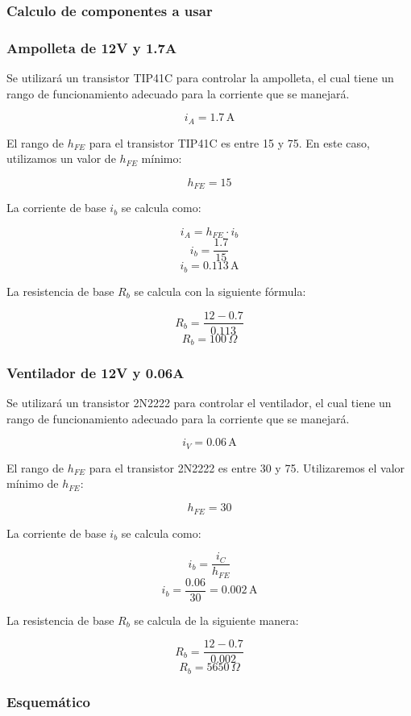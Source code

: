\documentclass[spanish, a4paper, 11pt]{article}
\begin{document}
\subsubsection{Calculo de componentes a usar}

\subsubsection*{Ampolleta de 12V y 1.7A}

Se utilizará un transistor TIP41C para controlar la ampolleta, el cual tiene un rango de funcionamiento adecuado para la corriente que se manejará.

\[
i_A = 1.7 \, \text{A}
\]

El rango de \( h_{FE} \) para el transistor TIP41C es entre 15 y 75. En este caso, utilizamos un valor de \( h_{FE} \) mínimo:

\[
h_{FE} = 15
\]

La corriente de base \( i_b \) se calcula como:

\[
i_A = h_{FE} \cdot i_b
\]
\[
i_b = \frac{1.7}{15}
\]
\[
i_b = 0.113 \, \text{A}
\]

La resistencia de base \( R_b \) se calcula con la siguiente fórmula:

\[
R_b = \frac{12 - 0.7}{0.113}
\]
\[
R_b = 100 \, \Omega
\]

\subsubsection*{Ventilador de 12V y 0.06A}

Se utilizará un transistor 2N2222 para controlar el ventilador, el cual tiene un rango de funcionamiento adecuado para la corriente que se manejará.

\[
i_V = 0.06 \, \text{A}
\]

El rango de \( h_{FE} \) para el transistor 2N2222 es entre 30 y 75. Utilizaremos el valor mínimo de \( h_{FE} \):

\[
h_{FE} = 30
\]

La corriente de base \( i_b \) se calcula como:

\[
i_b = \frac{i_C}{h_{FE}}
\]
\[
i_b = \frac{0.06}{30} = 0.002 \, \text{A}
\]

La resistencia de base \( R_b \) se calcula de la siguiente manera:

\[
R_b = \frac{12 - 0.7}{0.002}
\]
\[
R_b = 5650 \, \Omega
\]

\subsubsection{Esquemático}
\end{document}
